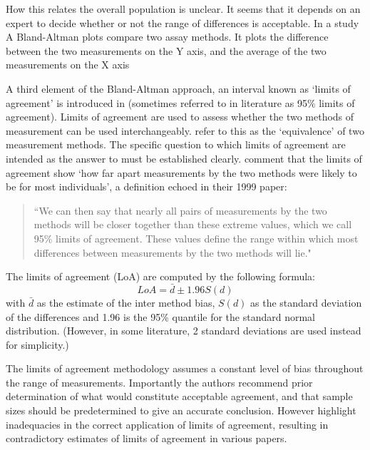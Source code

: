 \documentclass[Main.tex]{subfiles}
\begin{document}
	How this relates the overall population is unclear. It seems that
	it depends on an expert to decide whether or not the range of
	differences is acceptable. In a study A Bland-Altman plots compare
	two assay methods. It plots the difference between the two
	measurements on the Y axis, and the average of the two
	measurements on the X axis
	


A third element of the Bland-Altman approach, an interval known as `limits of agreement' is introduced in \citet*{BA86}
(sometimes referred to in literature as 95\% limits of agreement). Limits of agreement are used to assess whether the two methods of
measurement can be used interchangeably. \citet{BA86} refer to this as the `equivalence' of two measurement methods. The specific question to which limits of agreement are intended as the answer to must be established clearly. \citet*{BA95} comment that the limits of agreement show `how far apart measurements by the two methods were likely to be for
most individuals', a definition echoed in their 1999 paper:

\begin{quote}``We can then say that nearly all pairs
	of measurements by the two methods will be closer together than
	these extreme values, which we call 95\% limits of agreement.
	These values define the range within which most differences
	between measurements by the two methods will lie."
\end{quote}


	
	The limits of agreement (LoA) are computed by the following
	formula:
	\begin{equation}
	LoA = \bar{d} \pm 1.96 S(d)
	\end{equation}
	with $\bar{d}$ as the estimate of the inter method bias, $S(d)$ as
	the standard deviation of the differences and 1.96 is the 95\%
	quantile for the standard normal distribution. (However, in some
	literature, 2 standard deviations are used instead for
	simplicity.) 
	




The limits of agreement methodology assumes a constant level of bias throughout the range of measurements. Importantly the authors recommend prior determination of what would constitute acceptable
agreement, and that sample sizes should be predetermined to give an accurate conclusion. However \citet{mantha} highlight inadequacies in the correct application of limits of agreement, resulting in contradictory estimates of limits of agreement in various papers.
\end{document}

